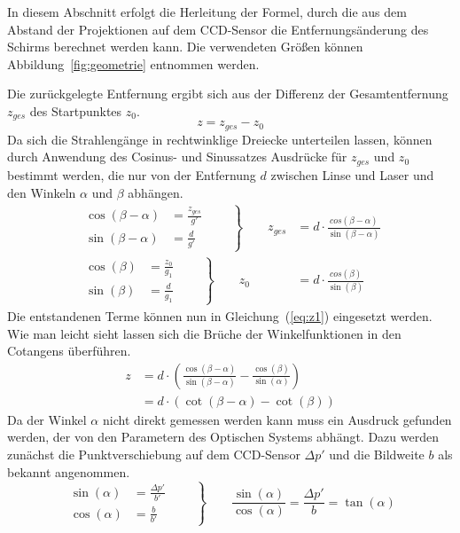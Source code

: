 In diesem Abschnitt erfolgt die Herleitung der Formel, durch die aus dem Abstand der Projektionen auf dem CCD-Sensor die Entfernungsänderung des Schirms berechnet werden kann. Die verwendeten Größen können Abbildung~\ref{fig:geometrie} entnommen werden.

Die zurückgelegte Entfernung ergibt sich aus der Differenz der Gesamtentfernung $z_{ges}$ des Startpunktes $z_0$.
\begin{equation}
	z = z_{ges} - z_0
	\label{eq:z1}
\end{equation}
Da sich die Strahlengänge in rechtwinklige Dreiecke unterteilen lassen, können durch Anwendung des Cosinus- und Sinussatzes Ausdrücke für $z_{ges}$ und $z_0$ bestimmt werden, die nur von der Entfernung $d$ zwischen Linse und Laser und den Winkeln $\alpha$ und $\beta$ abhängen.
\begin{align}
	\left.\begin{aligned}
		\cos(\beta-\alpha) &= \frac{z_{ges}}{g'}\\
		\sin(\beta-\alpha) &= \frac{d}{g'}
	\end{aligned}\qquad\right\}\qquad z_{ges} &= d\cdot\frac{cos(\beta-\alpha)}{\sin(\beta-\alpha)}\\[1em]
	\left.\begin{aligned}
		\cos(\beta) &= \frac{z_0}{g_1}\\ 
		\sin(\beta) &= \frac{d}{g_1}
	\end{aligned}\qquad\right\}\qquad z_0 &= d\cdot\frac{cos(\beta)}{\sin(\beta)}
\end{align}
Die entstandenen Terme können nun in Gleichung~(\ref{eq:z1}) eingesetzt werden. Wie man leicht sieht lassen sich die Brüche der Winkelfunktionen in den Cotangens überführen. 
\begin{align}
	z &= d\cdot\left(\frac{\cos(\beta-\alpha)}{\sin(\beta-\alpha)}-\frac{\cos(\beta)}{\sin(\alpha)}\right)\\
	  &= d\cdot\left(\cot(\beta-\alpha)-\cot(\beta)\right)
	  \label{eq:z2}
\end{align}
Da der Winkel $\alpha$ nicht direkt gemessen werden kann muss ein Ausdruck gefunden werden, der von den Parametern des Optischen Systems abhängt. Dazu werden zunächst die Punktverschiebung auf dem CCD-Sensor $\Delta p'$ und die Bildweite $b$ als bekannt angenommen.
\begin{equation}
	\left.\begin{aligned}
		\sin(\alpha) &= \frac{\Delta p'}{b'}\\
	\cos(\alpha) &= \frac{b}{b'}
	\end{aligned}\qquad\right\}\qquad
	\frac{\sin(\alpha)}{\cos(\alpha)} = \frac{\Delta p'}{b} = \tan(\alpha)
\end{equation}
